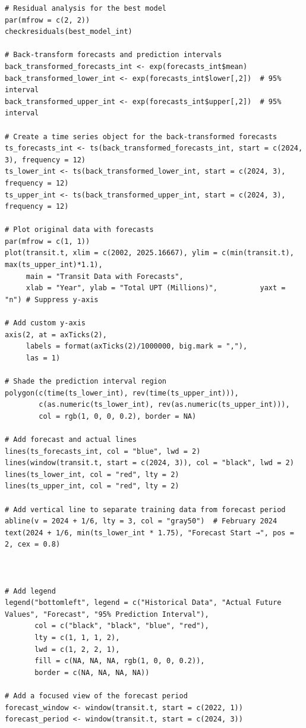 \documentclass[11pt]{article}
\begin{document}
{\begin{verbatim}
# Residual analysis for the best model
par(mfrow = c(2, 2))
checkresiduals(best_model_int)

# Back-transform forecasts and prediction intervals
back_transformed_forecasts_int <- exp(forecasts_int$mean)
back_transformed_lower_int <- exp(forecasts_int$lower[,2])  # 95% interval
back_transformed_upper_int <- exp(forecasts_int$upper[,2])  # 95% interval

# Create a time series object for the back-transformed forecasts
ts_forecasts_int <- ts(back_transformed_forecasts_int, start = c(2024, 3), frequency = 12)
ts_lower_int <- ts(back_transformed_lower_int, start = c(2024, 3), frequency = 12)
ts_upper_int <- ts(back_transformed_upper_int, start = c(2024, 3), frequency = 12)

# Plot original data with forecasts
par(mfrow = c(1, 1))
plot(transit.t, xlim = c(2002, 2025.16667), ylim = c(min(transit.t), max(ts_upper_int)*1.1),
     main = "Transit Data with Forecasts",
     xlab = "Year", ylab = "Total UPT (Millions)",          yaxt = "n") # Suppress y-axis

# Add custom y-axis
axis(2, at = axTicks(2),
     labels = format(axTicks(2)/1000000, big.mark = ","),
     las = 1)

# Shade the prediction interval region
polygon(c(time(ts_lower_int), rev(time(ts_upper_int))),
        c(as.numeric(ts_lower_int), rev(as.numeric(ts_upper_int))),
        col = rgb(1, 0, 0, 0.2), border = NA)

# Add forecast and actual lines
lines(ts_forecasts_int, col = "blue", lwd = 2)
lines(window(transit.t, start = c(2024, 3)), col = "black", lwd = 2)
lines(ts_lower_int, col = "red", lty = 2)
lines(ts_upper_int, col = "red", lty = 2)

# Add vertical line to separate training data from forecast period
abline(v = 2024 + 1/6, lty = 3, col = "gray50")  # February 2024
text(2024 + 1/6, min(ts_lower_int * 1.75), "Forecast Start →", pos = 2, cex = 0.8)



# Add legend
legend("bottomleft", legend = c("Historical Data", "Actual Future Values", "Forecast", "95% Prediction Interval"),
       col = c("black", "black", "blue", "red"),
       lty = c(1, 1, 1, 2),
       lwd = c(1, 2, 2, 1),
       fill = c(NA, NA, NA, rgb(1, 0, 0, 0.2)),
       border = c(NA, NA, NA, NA))

# Add a focused view of the forecast period
forecast_window <- window(transit.t, start = c(2022, 1))
forecast_period <- window(transit.t, start = c(2024, 3))


\end{verbatim}}
\end{document}
